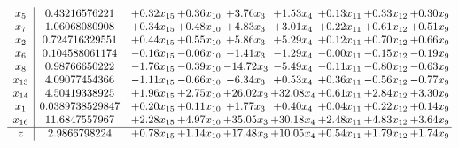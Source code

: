 \documentclass[9pt]{article}
\begin{document}
\[\begin{array}{c| c c@{\hskip 2pt} c@{\hskip 2pt} c@{\hskip 2pt} c@{\hskip 2pt} c@{\hskip 2pt} c@{\hskip 2pt} c@{\hskip 2pt} }
 x_{5}   &  0.43216576221 & +  0.32 x_{15} & +  0.36 x_{10} & +  3.76 x_{3} & +  1.53 x_{4} & +  0.13 x_{11} & +  0.33 x_{12} & +  0.30 x_{9}\\
 x_{7}   &  1.06068080908 & +  0.34 x_{15} & +  0.48 x_{10} & +  4.83 x_{3} & +  3.01 x_{4} & +  0.22 x_{11} & +  0.61 x_{12} & +  0.51 x_{9}\\
 x_{2}   &  0.724716329551 & +  0.44 x_{15} & +  0.55 x_{10} & +  5.86 x_{3} & +  5.29 x_{4} & +  0.12 x_{11} & +  0.70 x_{12} & +  0.66 x_{9}\\
 x_{6}   &  0.104588061174 & -0.16 x_{15} & -0.06 x_{10} & -1.41 x_{3} & -1.29 x_{4} & -0.00 x_{11} & -0.15 x_{12} & -0.19 x_{9}\\
 x_{8}   &  0.98766650222 & -1.76 x_{15} & -0.39 x_{10} & -14.72 x_{3} & -5.49 x_{4} & -0.11 x_{11} & -0.80 x_{12} & -0.63 x_{9}\\
 x_{13}   &  4.09077454366 & -1.11 x_{15} & -0.66 x_{10} & -6.34 x_{3} & +  0.53 x_{4} & +  0.36 x_{11} & -0.56 x_{12} & -0.77 x_{9}\\
 x_{14}   &  4.50419338925 & +  1.96 x_{15} & +  2.75 x_{10} & + 26.02 x_{3} & + 32.08 x_{4} & +  0.61 x_{11} & +  2.84 x_{12} & +  3.30 x_{9}\\
 x_{1}   &  0.0389738529847 & +  0.20 x_{15} & +  0.11 x_{10} & +  1.77 x_{3} & +  0.40 x_{4} & +  0.04 x_{11} & +  0.22 x_{12} & +  0.14 x_{9}\\
 x_{16}   &  11.6847557967 & +  2.28 x_{15} & +  4.97 x_{10} & + 35.05 x_{3} & + 30.18 x_{4} & +  2.48 x_{11} & +  4.83 x_{12} & +  3.64 x_{9}\\
\hline
z    &  2.9866798224 & +  0.78 x_{15} & +  1.14 x_{10} & + 17.48 x_{3} & + 10.05 x_{4} & +  0.54 x_{11} & +  1.79 x_{12} & +  1.74 x_{9}\\
\end{array}\]
\end{document}
